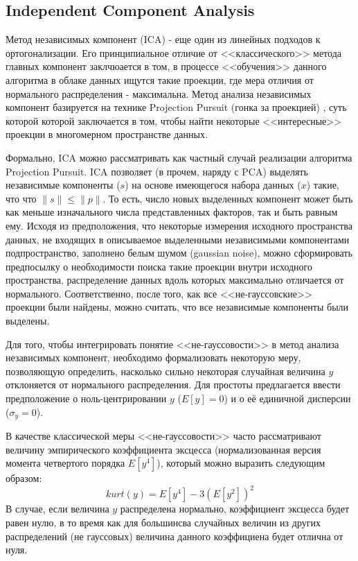 \documentclass[runningheads]{llncs}
\begin{document}
\subsection{Independent Component Analysis}
\hspace{0.4cm}
Метод независимых компонент (ICA) - еще один из линейных подходов к ортогонализации. Его принципиальное отличие от <<классического>> метода главных компонент заклчюается в том, в процессе <<обучения>> данного алгоритма в облаке данных ищутся такие проекции, где мера отличия от нормального распределения - максимальна. Метод анализа независимых компонент базируется на технике Projection Pursuit (гонка за проекцией) \cite{projpurs}, суть которой которой заключается в том, чтобы найти некоторые <<интересные>> проекции в многомерном пространстве данных.\par Формально, ICA можно рассматривать как частный случай реализации алгоритма Projection Pursuit. ICA позволяет (в прочем, наряду с PCA) выделять независимые компоненты ($s$) на основе имеющегося набора данных ($x$) такие, что что $\|s\| \leq \|p\|$. То есть, число новых выделенных компонент может быть как меньше изначального числа представленных факторов, так и быть равным ему. Исходя из предположения, что некоторые измерения исходного пространства данных, не входящих в описываемое выделенными независимыми компонентами подпространство, заполнено белым шумом (gaussian noise), можно сформировать предпосылку о необходимости поиска такие проекции внутри исходного пространства, распределение данных вдоль которых максимально отличается от нормального. Соответственно, после того, как все <<не-гауссовские>> проекции были найдены, можно считать, что все независимые компоненты были выделены. \par
Для того, чтобы интегрировать понятие <<не-гауссовости>> в метод анализа независимых компонент, необходимо формализовать некоторую меру, позволяющую определить, насколько сильно некоторая случайная величина $y$ отклоняется от нормального распределения. Для простоты предлагается ввести предположение о ноль-центрировании $y$ ($E[y] = 0$) и о её единичной дисперсии ($\sigma_y = 0$).\par
В качестве классической меры <<не-гауссовости>> часто рассматривают величину эмпирического коэффициента эксцесса (нормализованная версия момента четвертого порядка $E[y^4]$), который можно выразить следующим образом:$$kurt(y) = E[y^4] - 3(E[y^2])^2$$
В случае, если величина $y$ распределена нормально, коэффициент эксцесса будет равен нулю, в то время как для большинсва случайных величин из других распределений (не гауссовых) величина данного коэффициена будет отлична от нуля.\par
\end{document}
